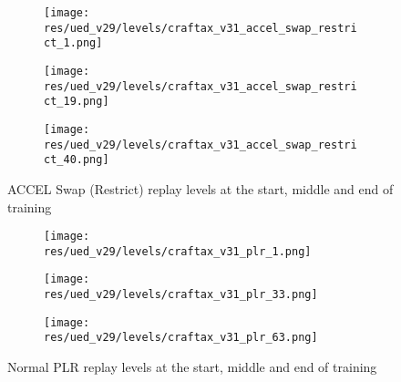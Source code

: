 \documentclass{article}
\theoremstyle{plain}
\theoremstyle{definition}
\theoremstyle{remark}
\begin{document}
\begin{figure}[H]
\begin{minipage}{0.47\linewidth}
    \centering
    \begin{subfigure}[t]{0.3\linewidth}
        \texttt{[image: res/ued\_v29/levels/craftax\_v31\_accel\_swap\_restrict\_1.png]}
    \end{subfigure}\hfill%
    \begin{subfigure}[t]{0.3\linewidth}
        \texttt{[image: res/ued\_v29/levels/craftax\_v31\_accel\_swap\_restrict\_19.png]}
    \end{subfigure}\hfill%
    \begin{subfigure}[t]{0.3\linewidth}
        \texttt{[image: res/ued\_v29/levels/craftax\_v31\_accel\_swap\_restrict\_40.png]}
    \end{subfigure}%
    \caption{ACCEL Swap (Restrict) replay levels at the start, middle and end of training}
    \label{fig:examples_accel_swap_restrict}
    \end{minipage}\hfill
    \begin{minipage}{0.47\linewidth}
    \centering
    \begin{subfigure}[t]{0.3\linewidth}
        \texttt{[image: res/ued\_v29/levels/craftax\_v31\_plr\_1.png]}
    \end{subfigure}\hfill%
    \begin{subfigure}[t]{0.3\linewidth}
        \texttt{[image: res/ued\_v29/levels/craftax\_v31\_plr\_33.png]}
    \end{subfigure}\hfill%
    \begin{subfigure}[t]{0.3\linewidth}
        \texttt{[image: res/ued\_v29/levels/craftax\_v31\_plr\_63.png]}
    \end{subfigure}%
    \caption{Normal PLR replay levels at the start, middle and end of training}
    \label{fig:examples_normal_plr}
    \end{minipage}
\end{figure}
\end{document}
